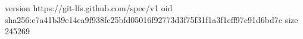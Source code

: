 version https://git-lfs.github.com/spec/v1
oid sha256:c7a41b39e14ea9f938fc25bfd05016f92773d3f75f31f1a3f1cff97c91d6bd7c
size 245269
